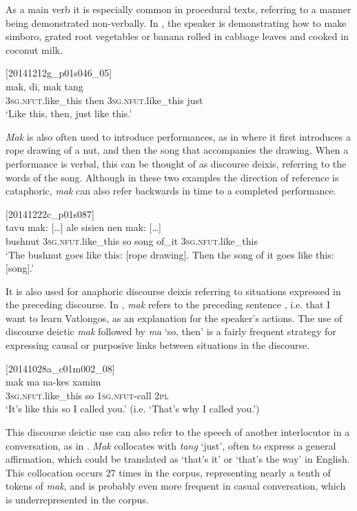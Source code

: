 \documentclass[output=paper,colorlinks,citecolor=brown]{langscibook}
\begin{document}
As a main verb it is especially common in procedural texts, referring to a manner being demonstrated non-verbally. In , the speaker is demonstrating how to make simboro, grated root vegetables or banana rolled in cabbage leaves and cooked in coconut milk.

\ea
{\label{ex:ridge:52}[20141212g\_p01s046\_05]}\\
\gll mak,  di,  mak   tang\\
     \textsc{3sg.nfut.}like\_this  then  \textsc{3sg.nfut.}like\_this  just\\
\glt ‘Like this, then, just like this.’
\z

\textit{Mak} is also often used to introduce performances, as in  where it first introduces a rope drawing of a nut, and then the song that accompanies the drawing. When a performance is verbal, this can be thought of as discourse deixis, referring to the words of the song. Although in these two examples the direction of reference is cataphoric, \textit{mak} can also refer backwards in time to a completed performance.

\ea
{\label{ex:ridge:53}[20141222c\_p01s087]}\\
\gll tavu  mak:  […]    ale  sisien  nen    mak: […]\\
     bushnut \textsc{3sg.nfut.}like\_this {}  so   song   of\_it \textsc{3sg.nfut.}like\_this\\
\glt ‘The bushnut goes like this: [rope drawing]. Then the song of it goes like this: [song].’
\z

It is also used for anaphoric discourse deixis referring to situations expressed in the preceding discourse. In , \textit{mak} refers to the preceding sentence , i.e. that I want to learn Vatlongos, as an explanation for the speaker’s actions. The use of discourse deictic \textit{mak} followed by \textit{ma} ‘so, then’ is a fairly frequent strategy for expressing causal or purposive links between situations in the discourse.

\ea
{\label{ex:ridge:54}[20141028a\_c01m002\_08]}\\
\gll mak      ma  na-kes      xamim\\
     \textsc{3sg.nfut.}like\_this   so   \textsc{1sg.nfut-}call   \textsc{2pl}\\
\glt ‘It’s like this so I called you.’ (i.e. ‘That’s why I called you.’)
\z

This discourse deictic use can also refer to the speech of another interlocutor in a conversation, as in . \textit{Mak} collocates with \textit{tang} ‘just’, often to express a general affirmation, which could be translated as ‘that’s it’ or ‘that’s the way’ in English. This collocation occurs 27 times in the corpus, representing nearly a tenth of tokens of \textit{mak}, and is probably even more frequent in casual conversation, which is underrepresented in the corpus.
\end{document}
